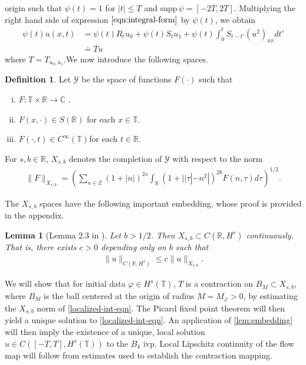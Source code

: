 \documentclass[12pt,reqno]{amsart}
\numberwithin{equation}{section}  %
\numberwithin{figure}{section}
\newcommand{\rr}{\mathbb{R}}
\newcommand{\zz}{\mathbb{Z}}
\newcommand{\cc}{\mathbb{C}}
\newcommand{\ci}{\mathbb{T}}
\newcommand{\wh}{\widehat}
\newcommand{\vp}{\varphi}
\theoremstyle{plain}
\newtheorem{lemma}{Lemma}
\theoremstyle{definition}
\newtheorem{definition}{Definition}
\theoremstyle{remark}
\begin{document}
origin such that $\psi(t) = 1$ for $|t| \le T$ and $\text{supp} \, \psi 
= [-2T, 2T ]$. Multiplying the right hand side of expression
$\eqref{eqn:integral-form}$ by $\psi(t)$, we obtain
%
%
\begin{equation}
  \begin{split}
    \psi(t) u(x,t)
    & = \psi(t) R_{t} u_{0} + \psi(t) S_{t}u_{1} +
    \psi(t) \int_{0}^{t} S_{t-t'}
    (u^{2})_{xx} dt'
    \\
    & \doteq Tu
  \end{split}
  \label{localized-int-eqn}
\end{equation}
where $T=T_{u_0, u_1}$.We now introduce the following spaces. 
%
%
\begin{definition}
  Let $\mathcal{Y}$ be the space of functions $F(\cdot)$ such that
  \begin{enumerate}[(i)]
   \item{$F: \ci \times \rr \to \cc$ }.
   \item{ $F(x, \cdot) \in S(\rr)$ for each $x \in \ci$}.
   \item{ $F(\cdot, t) \in C^{\infty}(\ci)$for each $t \in \rr$}.
  \end{enumerate}
  For $s, b \in \rr$, $X_{s,b}$ denotes the completion of $\mathcal{Y}$ with
  respect to the norm
  \begin{equation}
  \begin{split}
    \|F\|_{X_{s,b}} = \left( \sum_{n \in \zz} (1 + |n|)^{2s} \int_{\rr}
    (1 + | | \tau | - n^{2} |)^{2b} \wh{F}(n, \tau) d \tau\right)^{1/2}.
  \end{split}
  \label{eqn:bous-norm}
  \end{equation}
\end{definition}
%
The $X_{s,b}$ spaces have the following important embedding, whose proof is
provided in the appendix.
%
%
%
%
%
%
%
%
\begin{lemma}[Lemma 2.3 in \cite{Farah:2009uq}]
  Let $b > 1/2$. Then $X_{s, b} \subset C(\rr, H^s)$ continuously. That is, there exists $c>0$ depending only on $b$ such that
%
%
\begin{equation*}
\begin{split}
  \| u \|_{C(\rr, H^s) } \le c \| u \|_{X_{s,b}}.
\end{split}
\end{equation*}
%
\label{lem:embedding}
\end{lemma}
%
%
We will 
show that for initial data $\vp \in {H}^s(\ci)$, $T$ is a contraction on $B_M 
\subset {X}_{s,b}$, where $B_M$ is the ball centered at the origin of radius $M = 
M_{\vp}> 0$, by estimating the $X_{s,b}$
norm of \eqref{localized-int-eqn}. The Picard fixed point theorem will
then yield a unique solution to
\eqref{localized-int-eqn}. An application of \autoref{lem:embedding}
will then imply the existence of a unique, local
solution $u \in C([-T, T], H^s(\ci))$ to the $B_4$ ivp. Local Lipschitz continuity of the flow map will follow from estimates used to establish the contraction mapping. %
%
%
%
%
%
%
%
%
%
\end{document}
